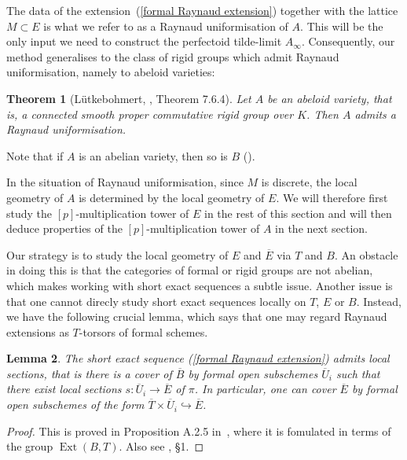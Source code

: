 \documentclass[10pt,oneside]{amsart}
\newtheorem{theorem}{Theorem}[section]
\newtheorem{lemma}[theorem]{Lemma}
\theoremstyle{definition}
\begin{document}
	The data of the extension~(\ref{formal Raynaud extension}) together with the lattice $M\subset E$ is what we refer to as a Raynaud uniformisation of $A$. This will be the only input we need to construct the perfectoid tilde-limit $A_\infty$. Consequently, our method generalises to the class of rigid groups which admit Raynaud uniformisation, namely to abeloid varieties:
	\begin{theorem}[L\"utkebohmert, \cite{Lut}, Theorem 7.6.4]\label{Raynaud uniformisation for abeloids}
		Let $A$ be an abeloid variety, that is, a connected smooth proper commutative rigid group over $K$. Then $A$ admits a Raynaud uniformisation.
	\end{theorem}
	
Note that if $A$ is an abelian variety, then so is $B$ (\cite[Theorem 6.4.8]{Lut}).

	
	In the situation of Raynaud uniformisation, since $M$ is discrete, the local geometry of $A$ is determined by the local geometry of $E$. We will therefore first study the $[p]$-multiplication tower of $E$ in the rest of this section and will then deduce properties of the $[p]$-multiplication tower of $A$ in the next section.

	 Our strategy is to study the local geometry of $E$ and $\overline{E}$ via $T$ and $B$. An obstacle in doing this is that the categories of formal or rigid groups are not abelian, which makes working with short exact sequences a subtle issue. Another issue is that one cannot direcly study short exact sequences locally on $T$, $E$ or $B$. 
	Instead, we have the following crucial lemma, which says that one may regard Raynaud extensions as $T$-torsors of formal schemes.

	\begin{lemma}\label{formal Raynaud sequence is locally split}
		The short exact sequence (\ref{formal Raynaud extension}) admits local sections, that is there is a cover of $\overline{B}$ by formal open subschemes $\overline{U}_i$ such that there exist local sections $s:\overline{U}_i\rightarrow \overline{E}$ of $\pi$. In particular, one can cover $\overline{E}$ by formal open subschemes of the form $\overline{T}\times \overline{U}_i\hookrightarrow \overline{E}$.
	\end{lemma}
	\begin{proof}
		This is proved in Proposition A.2.5 in~\cite{Lut}, where it is fomulated in terms of the group $\operatorname{Ext}(B,T)$. Also see \cite{BL}, \S 1.
	\end{proof}
\end{document}
